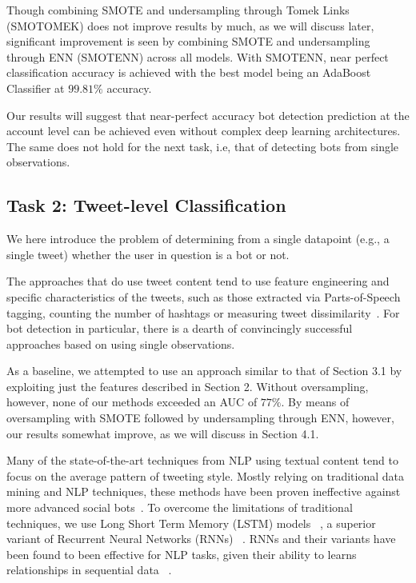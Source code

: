 Though combining SMOTE and undersampling through Tomek Links (SMOTOMEK) does not improve results by much, as we will discuss later, significant improvement is seen by combining SMOTE and undersampling through ENN (SMOTENN) across all models. With SMOTENN, near perfect classification accuracy is achieved with the best model being an AdaBoost Classifier at $99.81\%$ accuracy. \par 

Our results will suggest that near-perfect accuracy bot detection prediction at the account level can be achieved even without complex deep learning architectures. The same does not hold for the next task, i.e,  that of detecting bots from single observations.

\subsection{Task 2: Tweet-level Classification}
We here introduce the problem of determining from a single datapoint (e.g., a single tweet) whether the user in question is a bot or not. 

The approaches that do use tweet content tend to use feature engineering and specific characteristics of the tweets, such as those extracted via Parts-of-Speech tagging, counting the number of hashtags or measuring tweet dissimilarity~\cite{ferrara2016rise}. For bot detection in particular, there is a dearth of convincingly successful approaches based on using single observations. \par 

As a baseline, we attempted to use an approach similar to that of Section 3.1 by exploiting just the features described in Section 2. Without oversampling, however, none of our methods exceeded an AUC of $77\%$. By means of oversampling with SMOTE followed by undersampling through ENN, however, our results somewhat improve, as we will discuss in Section 4.1. \par 

Many of the state-of-the-art techniques from NLP using textual content tend to focus on the average pattern of tweeting style. Mostly relying on traditional data mining and NLP techniques, these methods have been proven ineffective against more advanced social bots~\cite{cresci2017paradigm}. To overcome the limitations of traditional techniques, we use Long Short Term Memory (LSTM) models ~\cite{hochreiter1997long}, a superior variant of Recurrent Neural Networks (RNNs) ~\cite{jozefowicz2015empirical}. RNNs and their variants have been found to been effective for NLP tasks, given their ability to learns relationships in sequential data ~\cite{goldberg2016primer}. \par 






